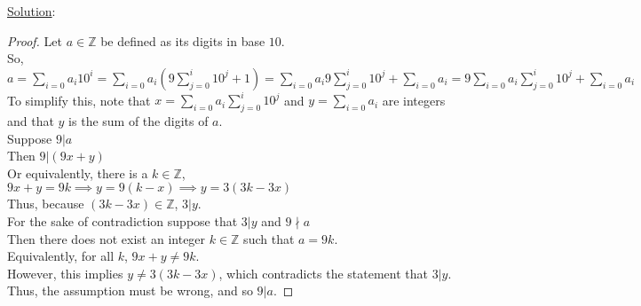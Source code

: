 \documentclass{article} %
\begin{document}
\underline{Solution}: 
\begin{addmargin}[1em]{0em}
\begin{proof}
Let $a \in \mathbb{Z}$ be defined as its digits in base $10$.
\\So, $a = \sum_{i = 0}{a_i10^i} = \sum_{i=0}{a_i(9\sum_{j=0}^{i}{10^j} + 1)} = \sum_{i=0}{a_i9\sum_{j=0}^{i}{10^j}} + \sum_{i=0}{a_i} = 9\sum_{i=0}{a_i\sum_{j=0}^{i}{10^j}} + \sum_{i=0}{a_i}$
\\To simplify this, note that $x = \sum_{i=0}{a_i\sum_{j=0}^{i}{10^j}}$ and $y = \sum_{i=0}{a_i}$ are integers and that $y$ is the sum of the digits of $a$.
\\ \marginpar{$\Rightarrow$}
Suppose $9|a$
\\Then $9|(9x + y)$
\\Or equivalently, there is a $k \in \mathbb{Z}$, $9x + y = 9k \implies y = 9(k-x) \implies y = 3(3k - 3x)$ 
\\Thus, because $(3k - 3x) \in \mathbb{Z}$, $3|y$.
\\ \marginpar{$\Leftarrow$}
For the sake of contradiction suppose that $3|y$ and $9 \nmid a$
\\Then there does not exist an integer $k \in \mathbb{Z}$ such that $a = 9k$.
\\Equivalently, for all $k$, $9x + y \neq 9k$.
\\However, this implies $y \neq 3(3k - 3x)$, which contradicts the statement that $3|y$.
\\Thus, the assumption must be wrong, and so $9|a$.
\end{proof}
\end{addmargin}

\end{document}
